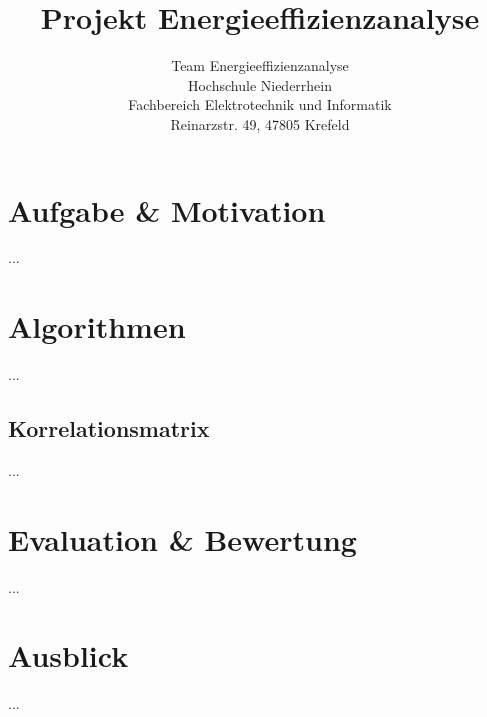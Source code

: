 \documentclass[11pt,a4paper,twocolumn]{article}
\title{\vspace*{-10mm}Projekt Energieeffizienzanalyse}
\author{
Team Energieeffizienzanalyse\\
Hochschule Niederrhein\\
Fachbereich Elektrotechnik und Informatik\\
Reinarzstr. 49, 47805 Krefeld
}
\date{}
\begin{document}
\renewcommand{\labelenumi}{\arabic{enumi})}


\thispagestyle{firstpage}

\section{Aufgabe \& Motivation}
...

\section{Algorithmen}
...

\subsection{Korrelationsmatrix}
...







\section{Evaluation \& Bewertung}
...

\section{Ausblick}
...



\end{document}
